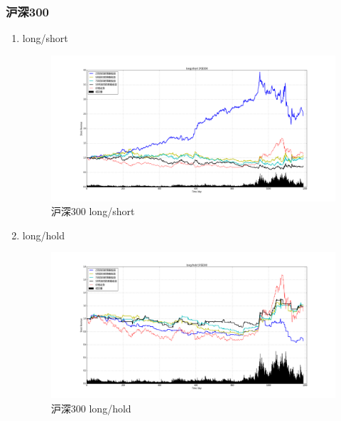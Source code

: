 \documentclass[12pt,a4paper]{article}
\begin{document}
\subsubsection{沪深300}
\begin{enumerate}
\item long/short 
\begin{figure}[H]
	\centering
	\includegraphics[width=1.0\textwidth]{img_r_2/hs300.png}
	\caption{沪深300 long/short }
\end{figure}
\item long/hold 
\begin{figure}[H]
	\centering
	\includegraphics[width=1.0\textwidth]{img_r_2/hs300_1.png}
	\caption{沪深300 long/hold }
\end{figure}
\end{enumerate}
\end{document}
